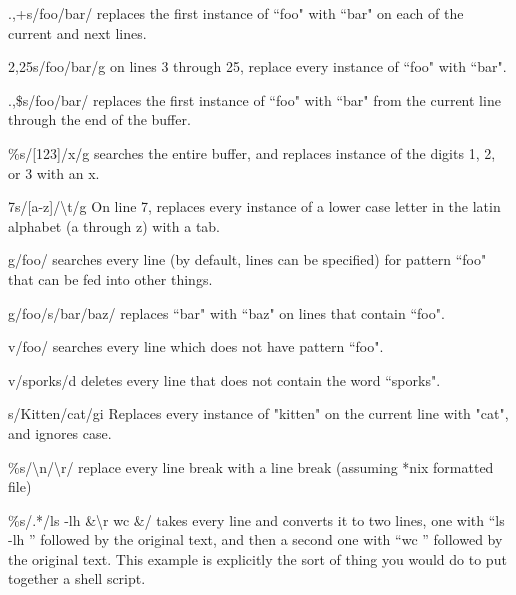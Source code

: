 \documentclass[12pt]{article}
\begin{document}
.,+s/foo/bar/ replaces the first instance of ``foo" with ``bar" on each of the current and next lines.

2,25s/foo/bar/g on lines 3 through 25, replace every instance of ``foo" with ``bar".

.,\$s/foo/bar/ replaces the first instance of ``foo" with ``bar" from the current line through the end of the buffer.

\%s/[123]/x/g searches the entire buffer, and replaces instance of the digits 1, 2, or 3 with an x.

7s/[a-z]/\textbackslash t/g  On line 7, replaces every instance of a lower case letter in the latin alphabet (a through z) with a tab.

g/foo/ searches every line (by default, lines can be specified) for pattern ``foo" that can be fed into other things.

g/foo/s/bar/baz/ replaces ``bar" with ``baz" on lines that contain ``foo".

v/foo/ searches every line which does not have pattern ``foo".

v/sporks/d deletes every line that does not contain the word ``sporks".

s/Kitten/cat/gi Replaces every instance of "kitten" on the current line with "cat", and ignores case.

\%s/\textbackslash n/\textbackslash r/ replace every line break with a line break (assuming *nix formatted file)

\%s/.*/ls -lh \&\textbackslash r wc \&/ takes every line and converts it to two lines, one with ``ls -lh '' followed by the original text, and then a second one with ``wc '' followed by the original text. This example is explicitly the sort of thing you would do to put together a shell script.
\end{document}
